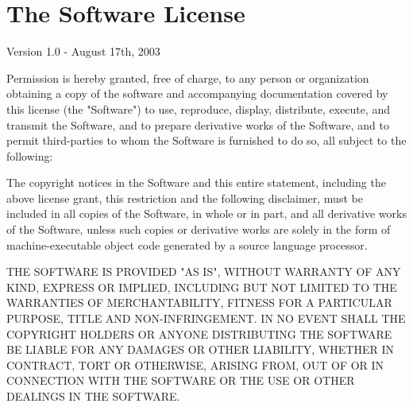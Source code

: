 \section{The \boost Software License}
\label{boost_license}

Version 1.0 - August 17th, 2003

Permission is hereby granted, free of charge, to any person or organization
obtaining a copy of the software and accompanying documentation covered by
this license (the "Software") to use, reproduce, display, distribute,
execute, and transmit the Software, and to prepare derivative works of the
Software, and to permit third-parties to whom the Software is furnished to
do so, all subject to the following:

The copyright notices in the Software and this entire statement, including
the above license grant, this restriction and the following disclaimer,
must be included in all copies of the Software, in whole or in part, and
all derivative works of the Software, unless such copies or derivative
works are solely in the form of machine-executable object code generated by
a source language processor.

THE SOFTWARE IS PROVIDED "AS IS", WITHOUT WARRANTY OF ANY KIND, EXPRESS OR
IMPLIED, INCLUDING BUT NOT LIMITED TO THE WARRANTIES OF MERCHANTABILITY,
FITNESS FOR A PARTICULAR PURPOSE, TITLE AND NON-INFRINGEMENT. IN NO EVENT
SHALL THE COPYRIGHT HOLDERS OR ANYONE DISTRIBUTING THE SOFTWARE BE LIABLE
FOR ANY DAMAGES OR OTHER LIABILITY, WHETHER IN CONTRACT, TORT OR OTHERWISE,
ARISING FROM, OUT OF OR IN CONNECTION WITH THE SOFTWARE OR THE USE OR OTHER
DEALINGS IN THE SOFTWARE.
